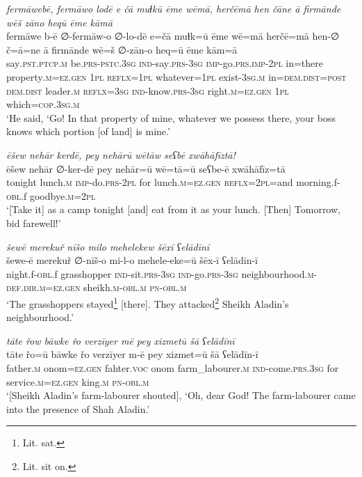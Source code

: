 \ea \label{PM.20}
\textit{fermāwebē, fermāwo lodē e čā muɫkū ēme wēmā, herčēmā hen čāne ā firmānde wēš zāno heqū ēme kāmā} \\ 
\gll fermāwe b-ē ∅-fermāw-o ∅-lo-dē e=čā muɫk=ū ēme wē=mā herčē=mā hen-∅ č=ā=ne ā firmānde wē=š ∅-zān-o heq=ū ēme kām=ā \\ 
 say\textsc{.pst}\textsc{.ptcp}\textsc{.m} be\textsc{.prs}\textsc{-pstc}\textsc{.3sg} \textsc{ind-}say\textsc{.prs}\textsc{-3sg} \textsc{imp-}go\textsc{.prs}.\textsc{imp-}\textsc{2pl} in=there property\textsc{.m}\textsc{\textsc{=ez.gen}} \textsc{1pl} \textsc{reflx}\textsc{=1pl} whatever\textsc{=1pl} exist\textsc{-3sg}\textsc{.m} in=\textsc{dem.dist}\textsc{=\textsc{post}} \textsc{dem.dist} leader\textsc{.m} \textsc{reflx}\textsc{=3sg} \textsc{ind-}know\textsc{.prs}\textsc{-3sg} right\textsc{.m}\textsc{\textsc{=ez.gen}} \textsc{1pl} which\textsc{=cop}\textsc{.3sg}\textsc{.m} \\ 
\glt `He said, ‘Go! In that property of mine, whatever we possess there, your boss knows which portion [of land] is mine.'
\z 
 
\ea \label{PM.21}
\textit{ēšew nehār kerdē, pey nehārū wētāw seʕbē xwāhāfīztā!} \\ 
\gll ēšew nehār ∅-ker-dē pey nehār=ū wē=tā=ū seʕbe-ē xwāhāfīz=tā \\ 
 tonight lunch\textsc{.m} \textsc{imp-}do\textsc{.prs}-\textsc{2pl} for lunch\textsc{.m}\textsc{\textsc{=ez.gen}} \textsc{reflx}=\textsc{2pl}=and morning.f\textsc{-obl}.f goodbye\textsc{.m}=\textsc{2pl} \\ 
\glt `[Take it] as a camp tonight [and] eat from it as your lunch. [Then] Tomorrow, bid farewell!'
\z 
 
\ea \label{PM.23}
\textit{šewē merekuř nīšo milo mehelekew šēxī ʕelādīnī} \\ 
\gll šewe-ē merekuř ∅-nīš-o mi-l-o mehele-eke=ū šēx-ī ʕelādīn-ī \\ 
 night.f\textsc{-obl}.f grasshopper \textsc{ind-}sit\textsc{.prs}\textsc{-3sg} \textsc{ind-}go\textsc{.prs}\textsc{-3sg} neighbourhood\textsc{.m}\textsc{-def}\textsc{.dir}\textsc{.m}\textsc{\textsc{=ez.gen}} sheikh\textsc{.m}\textsc{-obl}\textsc{.m} \textsc{pn}\textsc{-obl}\textsc{.m} \\ 
\glt `The grasshoppers stayed\footnote{Lit. sat.} [there]. They attacked\footnote{Lit. sit on.} Sheikh Aladin’s neighbourhood.'
\z 
 
\ea \label{PM.28}
\textit{tāte řow bāwke řo verzīyer mē pey xizmetū šā ʕelādīnī} \\ 
\gll tāte řo=ū bāwke řo verzīyer m-ē pey xizmet=ū šā ʕelādīn-ī \\ 
 father\textsc{.m} onom\textsc{\textsc{=ez.gen}} fahter.\textsc{voc} onom farm\_labourer\textsc{.m} \textsc{ind-}come\textsc{.prs}\textsc{.3sg} for service\textsc{.m}\textsc{\textsc{=ez.gen}} king\textsc{.m} \textsc{pn}\textsc{-obl}\textsc{.m} \\ 
\glt `[Sheikh Aladin’s farm-labourer shouted], ‘Oh, dear God! The farm-labourer came into the presence of Shah Aladin.'
\z 
 
